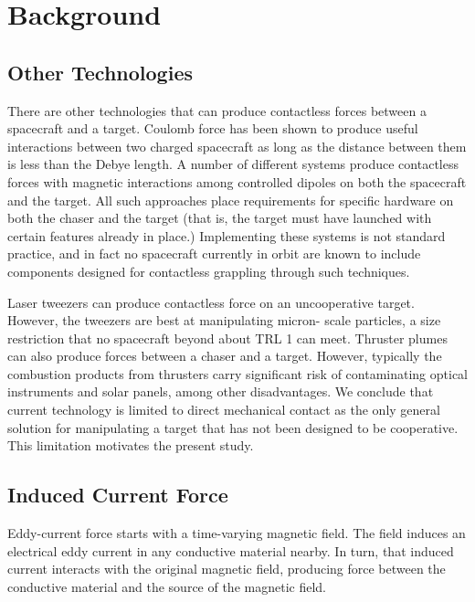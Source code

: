 \section{Background}
\subsection{Other Technologies}

There are other technologies that can produce contactless forces between a spacecraft and a target. Coulomb force has been shown to produce useful interactions between two charged spacecraft as long as the distance between them is less than the Debye length. \cite{coulombtether} A number of different systems produce contactless forces with magnetic interactions among controlled dipoles on both the spacecraft and the target.\cite{dipoleplanning} \cite{Kong2004}
All such approaches place requirements for specific hardware on both the chaser and the target (that is, the target must have launched with certain features already in place.) Implementing these systems is not standard practice, and in fact no spacecraft currently in orbit are known to include components designed for contactless grappling through such techniques.

Laser tweezers can produce contactless force on an uncooperative target. \cite{lasertweezers}However, the tweezers are best at manipulating micron- scale particles, a size restriction that no spacecraft beyond about TRL 1‎ can meet. \cite{lasermirrors} Thruster plumes can also produce forces between a chaser and a target. However, typically the combustion products from thrusters carry significant risk of contaminating optical instruments and solar panels, among other disadvantages. We conclude that current technology is limited to direct mechanical contact as the only general solution for manipulating a target that has not been designed to be cooperative.  This limitation motivates the present study.

\subsection{Induced Current Force}

Eddy-current force starts with a time-varying magnetic field. The field induces an electrical eddy current in any conductive material nearby. In turn, that induced current interacts with the original magnetic field, producing force between the conductive material and the source of the magnetic field.

